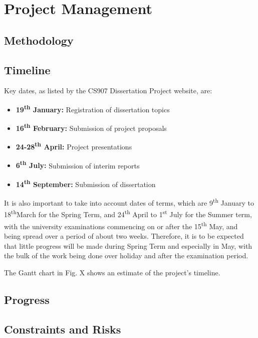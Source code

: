 \documentclass[11pt,journal]{IEEEtran}
\begin{document}
	\section{Project Management}
	
	\subsection{Methodology}
	
	\subsection{Timeline}
	Key dates, as listed by the CS907 Dissertation Project website, are:
	
	\begin{itemize}
		\item \textbf{19\textsuperscript{th} January:} Registration of dissertation topics
		\item \textbf{16\textsuperscript{th} February:} Submission of project proposals
		\item \textbf{24-28\textsuperscript{th} April:} Project presentations
		\item \textbf{6\textsuperscript{th} July:} Submission of interim reports
		\item \textbf{14\textsuperscript{th} September:} Submission of dissertation
	\end{itemize}

	It is also important to take into account dates of terms, which are 9\textsuperscript{th} January to 18\textsuperscript{th}March for the Spring Term, and 24\textsuperscript{th} April to 1\textsuperscript{st} July for the Summer term, with the university examinations commencing on or after the 15\textsuperscript{th} May, and being spread over a period of about two weeks. Therefore, it is to be expected that little progress will be made during Spring Term and especially in May, with the bulk of the work being done over holiday and after the examination period.
	
	The Gantt chart in Fig. X shows an estimate of the project's timeline. 
		
	\subsection{Progress}
	
	\subsection{Constraints and Risks}
\end{document}
